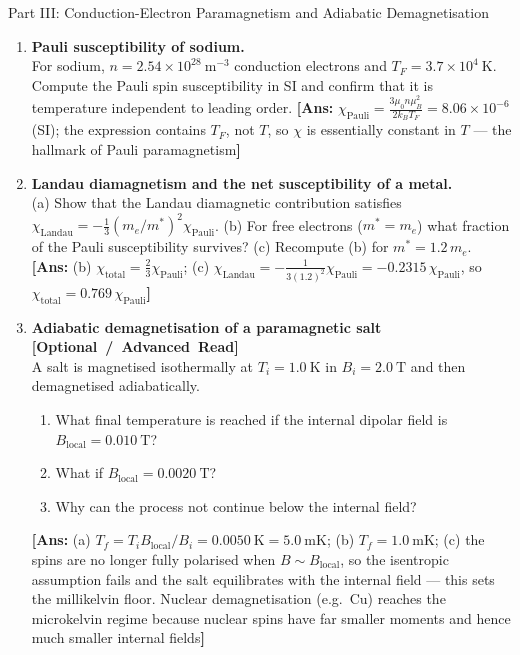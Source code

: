 \documentclass[11pt,a4paper]{article}
\newcommand{\extratag}{\hfill\mbox{\normalfont\footnotesize\sffamily\color{secondary}\textbf{[Optional / Advanced Read]}}}
\begin{document}
\begin{assignmentbox}{Part III: Conduction-Electron Paramagnetism and Adiabatic Demagnetisation}
\begin{enumerate}[label=\textbf{III.\arabic*.}, leftmargin=*]
    \item \textbf{Pauli susceptibility of sodium.}\\
    For sodium, $n = 2.54\times10^{28}\ \mathrm{m^{-3}}$ conduction electrons and $T_F = 3.7\times10^{4}\ \mathrm{K}$. Compute the Pauli spin susceptibility in SI and confirm that it is temperature independent to leading order.
    \textbf{[Ans:} $\chi_{\mathrm{Pauli}} = \frac{3\mu_0 n\mu_B^2}{2k_BT_F} = 8.06\times10^{-6}$ (SI); the expression contains $T_F$, not $T$, so $\chi$ is essentially constant in $T$ --- the hallmark of Pauli paramagnetism\textbf{]}

    \item \textbf{Landau diamagnetism and the net susceptibility of a metal.}\\
    (a) Show that the Landau diamagnetic contribution satisfies $\chi_{\mathrm{Landau}} = -\frac{1}{3}(m_e/m^*)^2\chi_{\mathrm{Pauli}}$.
    (b) For free electrons ($m^* = m_e$) what fraction of the Pauli susceptibility survives?
    (c) Recompute (b) for $m^* = 1.2\,m_e$.
    \textbf{[Ans:} (b) $\chi_{\mathrm{total}} = \frac{2}{3}\chi_{\mathrm{Pauli}}$; (c) $\chi_{\mathrm{Landau}} = -\frac{1}{3(1.2)^2}\chi_{\mathrm{Pauli}} = -0.2315\,\chi_{\mathrm{Pauli}}$, so $\chi_{\mathrm{total}} = 0.769\,\chi_{\mathrm{Pauli}}$\textbf{]}

    \item \textbf{Adiabatic demagnetisation of a paramagnetic salt \extratag}\\
    A salt is magnetised isothermally at $T_i = 1.0\ \mathrm{K}$ in $B_i = 2.0\ \mathrm{T}$ and then demagnetised adiabatically.
    \begin{enumerate}[label=(\alph*)]
        \item What final temperature is reached if the internal dipolar field is $B_{\mathrm{local}} = 0.010\ \mathrm{T}$?
        \item What if $B_{\mathrm{local}} = 0.0020\ \mathrm{T}$?
        \item Why can the process not continue below the internal field?
    \end{enumerate}
    \textbf{[Ans:} (a) $T_f = T_i B_{\mathrm{local}}/B_i = 0.0050\ \mathrm{K} = 5.0\ \mathrm{mK}$; (b) $T_f = 1.0\ \mathrm{mK}$; (c) the spins are no longer fully polarised when $B \sim B_{\mathrm{local}}$, so the isentropic assumption fails and the salt equilibrates with the internal field --- this sets the millikelvin floor. Nuclear demagnetisation (e.g.\ Cu) reaches the microkelvin regime because nuclear spins have far smaller moments and hence much smaller internal fields\textbf{]}


\end{enumerate}
\end{assignmentbox}
\end{document}
